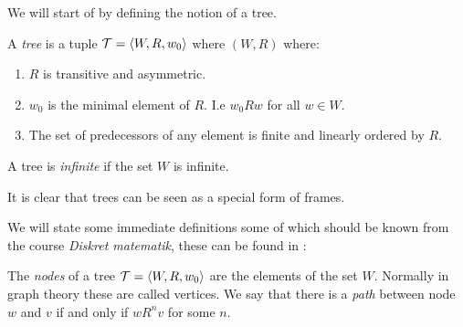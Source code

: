 \documentclass[../main.tex]{subfiles}
\begin{document}
We
will start of by defining the notion of a tree.
\begin{defi}
	A \textit{tree} is a tuple $\mathcal{T}=\langle W,R,w_0\rangle$ where $(W,R)$ where:
	\begin{enumerate}
		\item $R$ is transitive and asymmetric.
		\item $w_0$ is the minimal element of $R$. I.e $w_0
			Rw$ for all $w\in W$.
		\item The set of predecessors of any element is finite and
			linearly ordered by $R$.
	\end{enumerate}
	A tree is \textit{infinite} if the set $W$ is infinite.
\end{defi}

It is clear that trees can be seen as a special form of frames.

We will state some immediate definitions some of which should be known from the course
\textit{Diskret matematik}, these can be found in \parencite{Lutzen2015}:
\begin{defi}
	The \textit{nodes} of a tree $\mathcal{T}=\langle W,R,w_0\rangle$ are the
	elements of the set $W$. Normally in graph theory these are called
	vertices.
	We say that there is a \textit{path} between node $w$ and $v$ if and only if
	$wR^{n}v$ for some $n$.

\end{defi}
\end{document}
